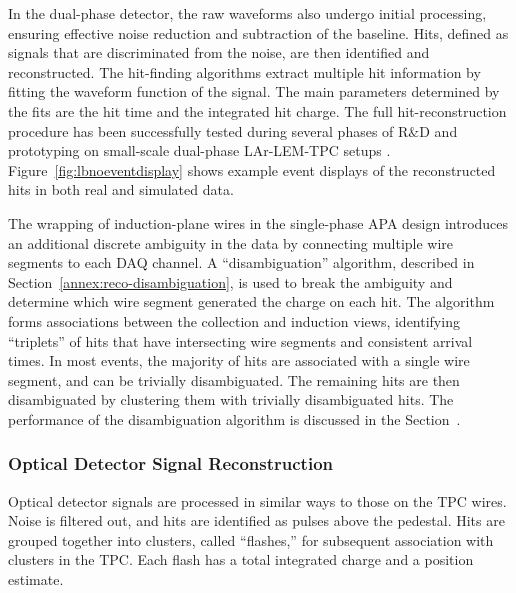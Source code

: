 In the dual-phase detector, the raw waveforms also undergo initial processing, 
ensuring effective noise reduction and subtraction of the baseline. 
Hits, defined as signals that are discriminated from the noise, are then identified and reconstructed.
The hit-finding algorithms extract multiple hit information 
 by fitting the waveform function of the signal.
The main parameters determined by the fits are the hit time and the integrated hit charge.
The full hit-reconstruction procedure has been successfully tested during several phases 
of R$\&$D and prototyping on small-scale dual-phase LAr-LEM-TPC setups \cite{Badertscher:2008rf,Badertscher:2012dq}.
Figure~\ref{fig:lbnoeventdisplay} shows example event displays of the reconstructed hits 
in both real and simulated data. 

The wrapping of induction-plane wires in the single-phase APA design
introduces an additional discrete ambiguity in the data by connecting multiple wire
segments to each DAQ channel. A ``disambiguation'' algorithm,
described in Section~\ref{annex:reco-disambiguation},  is used to break the
ambiguity and determine which wire segment generated the charge on each hit.
The algorithm forms associations between the collection and induction views,
identifying ``triplets'' of hits that have intersecting wire segments
and consistent arrival times. In most events, the majority of hits are
associated with a single wire segment, and can be trivially disambiguated.
The remaining hits are then disambiguated by clustering them with trivially disambiguated hits.
The performance of the disambiguation algorithm is discussed in the Section~\cite{annex:disambiguation}.


\subsubsection{Optical Detector Signal Reconstruction}


Optical detector signals are processed in similar ways to those on the TPC wires.
Noise is filtered out, and hits are identified as pulses above the pedestal.
Hits are grouped together into clusters, called ``flashes,'' for subsequent
association with clusters in the TPC.  Each flash has a total integrated charge and a position
estimate.

